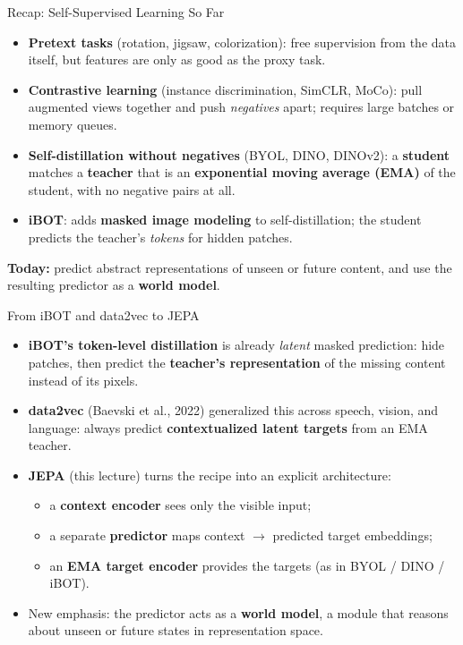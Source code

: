 \begin{frame}{Recap: Self-Supervised Learning So Far}
  \begin{itemize}\itemsep0.3em
    \item \textbf{Pretext tasks} (rotation, jigsaw, colorization): free supervision from the data itself, but features are only as good as the proxy task.
    \item \textbf{Contrastive learning} (instance discrimination, SimCLR, MoCo): pull augmented views together and push \emph{negatives} apart; requires large batches or memory queues.
    \item \textbf{Self-distillation without negatives} (BYOL, DINO, DINOv2): a \textbf{student} matches a \textbf{teacher} that is an \textbf{exponential moving average (EMA)} of the student, with no negative pairs at all.
    \item \textbf{iBOT}: adds \textbf{masked image modeling} to self-distillation; the student predicts the teacher's \emph{tokens} for hidden patches.
  \end{itemize}
  \vspace{0.4em}
  \textbf{Today:} predict abstract representations of unseen or future content, and use the resulting predictor as a \textbf{world model}.
\end{frame}

\begin{frame}{From iBOT and data2vec to JEPA}
  \begin{itemize}\itemsep0.3em
    \item \textbf{iBOT's token-level distillation} is already \emph{latent} masked prediction: hide patches, then predict the \textbf{teacher's representation} of the missing content instead of its pixels.
    \item \textbf{data2vec} (Baevski et al., 2022) generalized this across speech, vision, and language: always predict \textbf{contextualized latent targets} from an EMA teacher.
    \item \textbf{JEPA} (this lecture) turns the recipe into an explicit architecture:
    \begin{itemize}
      \item a \textbf{context encoder} sees only the visible input;
      \item a separate \textbf{predictor} maps context $\rightarrow$ predicted target embeddings;
      \item an \textbf{EMA target encoder} provides the targets (as in BYOL / DINO / iBOT).
    \end{itemize}
    \item New emphasis: the predictor acts as a \textbf{world model}, a module that reasons about unseen or future states in representation space.
  \end{itemize}
\end{frame}

